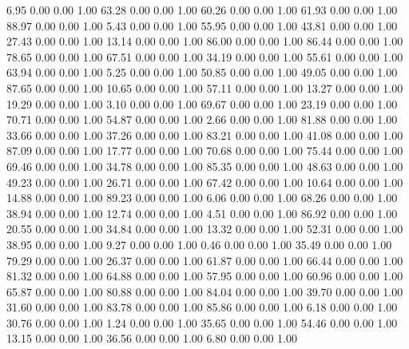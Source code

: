     6.95   0.00   0.00   1.00
   63.28   0.00   0.00   1.00
   60.26   0.00   0.00   1.00
   61.93   0.00   0.00   1.00
   88.97   0.00   0.00   1.00
    5.43   0.00   0.00   1.00
   55.95   0.00   0.00   1.00
   43.81   0.00   0.00   1.00
   27.43   0.00   0.00   1.00
   13.14   0.00   0.00   1.00
   86.00   0.00   0.00   1.00
   86.44   0.00   0.00   1.00
   78.65   0.00   0.00   1.00
   67.51   0.00   0.00   1.00
   34.19   0.00   0.00   1.00
   55.61   0.00   0.00   1.00
   63.94   0.00   0.00   1.00
    5.25   0.00   0.00   1.00
   50.85   0.00   0.00   1.00
   49.05   0.00   0.00   1.00
   87.65   0.00   0.00   1.00
   10.65   0.00   0.00   1.00
   57.11   0.00   0.00   1.00
   13.27   0.00   0.00   1.00
   19.29   0.00   0.00   1.00
    3.10   0.00   0.00   1.00
   69.67   0.00   0.00   1.00
   23.19   0.00   0.00   1.00
   70.71   0.00   0.00   1.00
   54.87   0.00   0.00   1.00
    2.66   0.00   0.00   1.00
   81.88   0.00   0.00   1.00
   33.66   0.00   0.00   1.00
   37.26   0.00   0.00   1.00
   83.21   0.00   0.00   1.00
   41.08   0.00   0.00   1.00
   87.09   0.00   0.00   1.00
   17.77   0.00   0.00   1.00
   70.68   0.00   0.00   1.00
   75.44   0.00   0.00   1.00
   69.46   0.00   0.00   1.00
   34.78   0.00   0.00   1.00
   85.35   0.00   0.00   1.00
   48.63   0.00   0.00   1.00
   49.23   0.00   0.00   1.00
   26.71   0.00   0.00   1.00
   67.42   0.00   0.00   1.00
   10.64   0.00   0.00   1.00
   14.88   0.00   0.00   1.00
   89.23   0.00   0.00   1.00
    6.06   0.00   0.00   1.00
   68.26   0.00   0.00   1.00
   38.94   0.00   0.00   1.00
   12.74   0.00   0.00   1.00
    4.51   0.00   0.00   1.00
   86.92   0.00   0.00   1.00
   20.55   0.00   0.00   1.00
   34.84   0.00   0.00   1.00
   13.32   0.00   0.00   1.00
   52.31   0.00   0.00   1.00
   38.95   0.00   0.00   1.00
    9.27   0.00   0.00   1.00
    0.46   0.00   0.00   1.00
   35.49   0.00   0.00   1.00
   79.29   0.00   0.00   1.00
   26.37   0.00   0.00   1.00
   61.87   0.00   0.00   1.00
   66.44   0.00   0.00   1.00
   81.32   0.00   0.00   1.00
   64.88   0.00   0.00   1.00
   57.95   0.00   0.00   1.00
   60.96   0.00   0.00   1.00
   65.87   0.00   0.00   1.00
   80.88   0.00   0.00   1.00
   84.04   0.00   0.00   1.00
   39.70   0.00   0.00   1.00
   31.60   0.00   0.00   1.00
   83.78   0.00   0.00   1.00
   85.86   0.00   0.00   1.00
    6.18   0.00   0.00   1.00
   30.76   0.00   0.00   1.00
    1.24   0.00   0.00   1.00
   35.65   0.00   0.00   1.00
   54.46   0.00   0.00   1.00
   13.15   0.00   0.00   1.00
   36.56   0.00   0.00   1.00
    6.80   0.00   0.00   1.00
